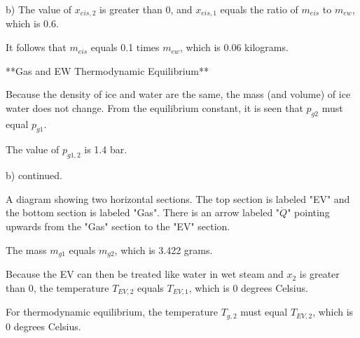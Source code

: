 b) The value of \( x_{eis,2} \) is greater than 0, and \( x_{eis,1} \) equals the ratio of \( m_{eis} \) to \( m_{ew} \), which is 0.6.

It follows that \( m_{eis} \) equals 0.1 times \( m_{ew} \), which is 0.06 kilograms.

**Gas and EW Thermodynamic Equilibrium**

Because the density of ice and water are the same, the mass (and volume) of ice water does not change. From the equilibrium constant, it is seen that \( p_{g2} \) must equal \( p_{g1} \).

The value of \( p_{g1,2} \) is 1.4 bar.

b) continued.

A diagram showing two horizontal sections. The top section is labeled "EV" and the bottom section is labeled "Gas". There is an arrow labeled "\(\dot{Q}\)" pointing upwards from the "Gas" section to the "EV" section.

The mass \( m_{g1} \) equals \( m_{g2} \), which is 3.422 grams.

Because the EV can then be treated like water in wet steam and \( x_2 \) is greater than 0, the temperature \( T_{EV,2} \) equals \( T_{EV,1} \), which is 0 degrees Celsius.

For thermodynamic equilibrium, the temperature \( T_{g,2} \) must equal \( T_{EV,2} \), which is 0 degrees Celsius.
